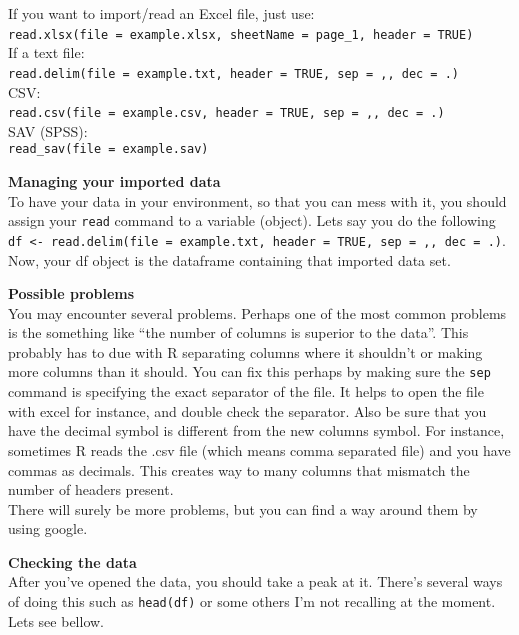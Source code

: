 \documentclass[
]{book}
\begin{document}
If you want to import/read an Excel file, just use:\\
\texttt{read.xlsx(file\ =\ \textquotesingle{}example.xlsx\textquotesingle{},\ sheetName\ =\ \textquotesingle{}page\_1\textquotesingle{},\ header\ =\ TRUE)}~\\
If a text file:\\
\texttt{read.delim(file\ =\ \textquotesingle{}example.txt\textquotesingle{},\ header\ =\ TRUE,\ sep\ =\ \textquotesingle{},\textquotesingle{},\ dec\ =\ \textquotesingle{}.\textquotesingle{})}~\\
CSV:\\
\texttt{read.csv(file\ =\ \textquotesingle{}example.csv\textquotesingle{},\ header\ =\ TRUE,\ sep\ =\ \textquotesingle{},\textquotesingle{},\ dec\ =\ \textquotesingle{}.\textquotesingle{})}~\\
SAV (SPSS):\\
\texttt{read\_sav(file\ =\ \textquotesingle{}example.sav\textquotesingle{})}

\textbf{Managing your imported data}\\
To have your data in your environment, so that you can mess with it, you should assign your \texttt{read} command to a variable (object). Lets say you do the following \texttt{df\ \textless{}-\ read.delim(file\ =\ \textquotesingle{}example.txt\textquotesingle{},\ header\ =\ TRUE,\ sep\ =\ \textquotesingle{},\textquotesingle{},\ dec\ =\ \textquotesingle{}.\textquotesingle{})}. Now, your df object is the dataframe containing that imported data set.

\textbf{Possible problems}\\
You may encounter several problems. Perhaps one of the most common problems is the something like ``the number of columns is superior to the data''. This probably has to due with R separating columns where it shouldn't or making more columns than it should. You can fix this perhaps by making sure the \texttt{sep} command is specifying the exact separator of the file. It helps to open the file with excel for instance, and double check the separator. Also be sure that you have the decimal symbol is different from the new columns symbol. For instance, sometimes R reads the .csv file (which means comma separated file) and you have commas as decimals. This creates way to many columns that mismatch the number of headers present.\\
There will surely be more problems, but you can find a way around them by using google.

\textbf{Checking the data}\\
After you've opened the data, you should take a peak at it. There's several ways of doing this such as \texttt{head(df)} or some others I'm not recalling at the moment. Lets see bellow.
\end{document}
